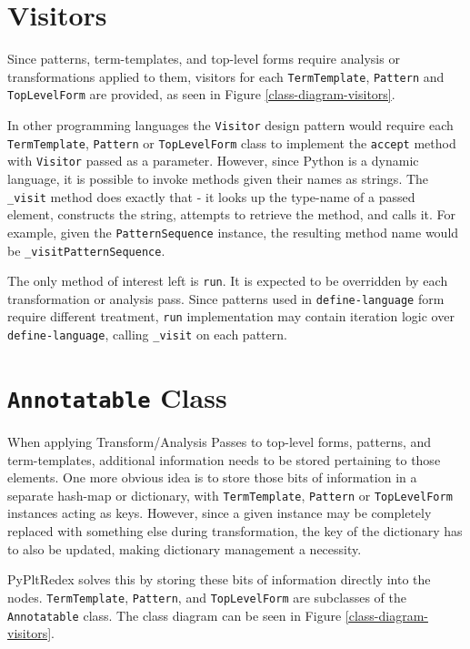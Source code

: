 \section{Visitors}
\label{section:visitors}
Since patterns, term-templates, and top-level forms require analysis or transformations applied to them, visitors for each \texttt{TermTemplate}, \texttt{Pattern} and \texttt{TopLevelForm} are provided, as seen in Figure \ref{class-diagram-visitors}.

In other programming languages the \texttt{Visitor} design pattern would require each \newline \texttt{TermTemplate}, \texttt{Pattern} or \texttt{TopLevelForm} class to implement the \texttt{accept} method with \texttt{Visitor} passed as a parameter. However, since Python is a dynamic language, it is possible to invoke methods given their names as strings. The \texttt{\_visit} method does exactly that - it looks up the type-name of a passed element, constructs the string, attempts to retrieve the method, and calls it. For example, given the \texttt{PatternSequence} instance, the resulting method name would be \texttt{\_visitPatternSequence}.

The only method of interest left is \texttt{run}. It is expected to be overridden by each transformation or analysis pass.  Since patterns used in \texttt{define-language} form require different treatment, \texttt{run} implementation may contain iteration logic over \texttt{define-language}, calling \texttt{\_visit} on each pattern.

\section{\texttt{Annotatable} Class}

When applying Transform/Analysis Passes to top-level forms, patterns, and term-templates, additional information needs to be stored pertaining to those elements. One more obvious idea is to store those bits of information in a separate hash-map or dictionary, with \texttt{TermTemplate}, \texttt{Pattern} or \texttt{TopLevelForm} instances acting as keys. However, since a given instance may be completely replaced with something else during transformation, the key of the dictionary has to also be updated, making dictionary management a necessity.

PyPltRedex solves this by storing these bits of information directly into the nodes. \texttt{TermTemplate}, \texttt{Pattern}, and \texttt{TopLevelForm} are subclasses of the \texttt{Annotatable} class. The class diagram can be seen in Figure \ref{class-diagram-visitors}.

